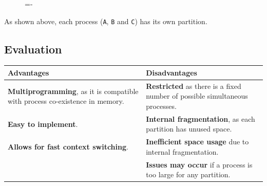 \documentclass[a4paper]{systems-software}
\begin{document}
\begin{figure}[H]
  \lineskip=-\fboxrule
\end{figure}

As shown above, each process (\texttt{A}, \texttt{B} and \texttt{C}) has its own partition.

\subsection*{Evaluation}

\begin{longtabu} to \textwidth {| X[1,l] | X[1,l] |}
    \hline
    \textbf{Advantages} & \textbf{Disadvantages}
	\\ \hline
	\textbf{Multiprogramming}, as it is compatible with process co-existence in memory. &
	\textbf{Restricted} as there is a fixed number of possible simultaneous processes.
	\\ \hline
	\textbf{Easy to implement}. &
	\textbf{Internal fragmentation}, as each partition has unused space.
	\\ \hline
	\textbf{Allows for fast context switching}. & \textbf{Inefficient space usage} due to internal fragmentation.
	\\ \hline
	& \textbf{Issues may occur} if a process is too large for any partition.
	\\ \hline
\end{longtabu}
\end{document}
